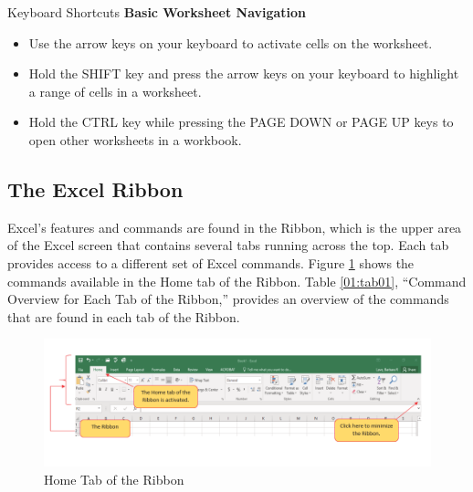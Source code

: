 \begin{center}
	\begin{shtcutbox}{Keyboard Shortcuts}
		\textbf{Basic Worksheet Navigation}
		\\
		\begin{itemize}
			\setlength{\itemsep}{0pt}
			\setlength{\parskip}{0pt}
			\setlength{\parsep}{0pt}

			\item Use the arrow keys on your keyboard to activate cells on the worksheet.
			\item Hold the SHIFT key and press the arrow keys on your keyboard to highlight a range of cells in a worksheet.
			\item Hold the CTRL key while pressing the PAGE DOWN or PAGE UP keys to open other worksheets in a workbook.

		\end{itemize}
	\end{shtcutbox}
\end{center}

\subsection{The Excel Ribbon}

Excel's features and commands are found in the Ribbon, which is the upper area of the Excel screen that contains several tabs running across the top. Each tab provides access to a different set of Excel commands. Figure \ref{01:fig06} shows the commands available in the Home tab of the Ribbon. Table \ref{01:tab01}, ``Command Overview for Each Tab of the Ribbon,'' provides an overview of the commands that are found in each tab of the Ribbon.

\begin{figure}[H]
	\centering
	\includegraphics[width=\maxwidth{.95\linewidth}]{gfx/ch01_fig06}
	\caption{Home Tab of the Ribbon}
	\label{01:fig06}
\end{figure}

